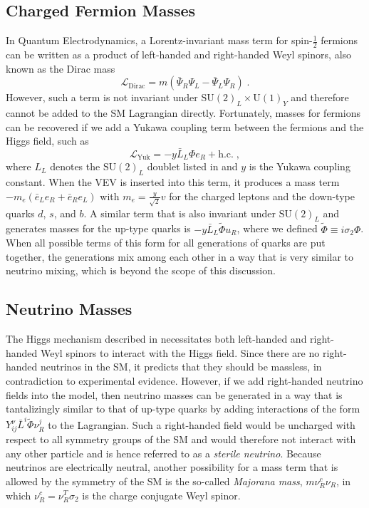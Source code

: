 \subsection{Charged Fermion Masses}
\label{sec:charged-fermion-masses}
In Quantum Electrodynamics, a Lorentz-invariant mass term for spin-$\frac{1}{2}$ fermions can be written as a product of left-handed and right-handed Weyl spinors, also known as the Dirac mass
\begin{equation}
    \mathcal{L}_\mathrm{Dirac} = m (\bar{\Psi}_R \Psi_L - \bar{\Psi}_L \Psi_R)\;.
\end{equation}
However, such a term is not invariant under $\mathrm{SU}(2)_L \times \mathrm{U}(1)_Y$ and therefore cannot be added to the SM Lagrangian directly. Fortunately, masses for fermions can be recovered if we add a Yukawa coupling term between the fermions and the Higgs field, such as
\begin{equation}
    \mathcal{L}_\mathrm{Yuk} = -y \bar{L}_L \Phi e_R + \mathrm{h.c.}\;,
\end{equation}
where $L_L$ denotes the $\mathrm{SU}(2)_L$ doublet listed in  and $y$ is the Yukawa coupling constant. When the VEV is inserted into this term, it produces a mass term $-m_e (\bar{e}_L e_R + \bar{e}_R e_L)$ with $m_e = \frac{y}{\sqrt{2}}v$ for the charged leptons and the down-type quarks $d$, $s$, and $b$.  A similar term that is also invariant under $\mathrm{SU}(2)_L$ and generates masses for the up-type quarks is $-y \bar{L}_L \tilde{\Phi} u_R$, where we defined $\tilde{\Phi} \equiv i \sigma_2 \Phi$. When all possible terms of this form for all generations of quarks are put together, the generations mix among each other in a way that is very similar to neutrino mixing, which is beyond the scope of this discussion.

\subsection{Neutrino Masses}

The Higgs mechanism described in  necessitates both left-handed and right-handed Weyl spinors to interact with the Higgs field. Since there are no right-handed neutrinos in the SM, it predicts that they should be massless, in contradiction to experimental evidence. However, if we add right-handed neutrino fields into the model, then neutrino masses can be generated in a way that is tantalizingly similar to that of up-type quarks by adding interactions of the form $Y_{ij}^\nu \bar{L}^i \tilde{\Phi}\nu_R^j$ to the Lagrangian. Such a right-handed field would be uncharged with respect to all symmetry groups of the SM and would therefore not interact with any other particle and is hence referred to as a \emph{sterile neutrino}. Because neutrinos are electrically neutral, another possibility for a mass term that is allowed by the symmetry of the SM is the so-called \emph{Majorana mass}, $m \nu_R^c \nu_R$, in which $\nu_R^c=\nu_R^T \sigma_2$ is the charge conjugate Weyl spinor. 

